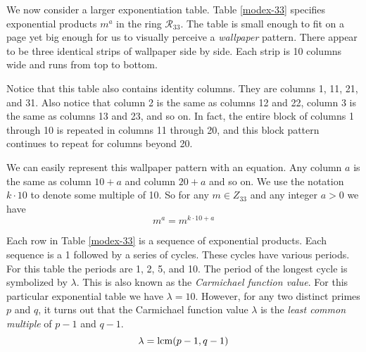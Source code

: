 

We now consider a larger exponentiation table.
Table \ref{modex-33} specifies exponential products $m^a$ in the ring $\mathcal{R}_{33}$.
The table is small enough to fit on a page 
yet big enough for us to visually perceive a \emph{wallpaper} pattern.
There appear to be three identical strips of wallpaper side by side.
Each strip is 10 columns wide and runs from top to bottom.

\begin{table}[!h]
\hspace{-9ex}
  
  \caption{$m^a \quad (\mathcal{R}_{33})$}
  \label{modex-33}
\end{table}

Notice that this table also contains identity columns.
They are columns 1, 11, 21, and 31.
Also notice that column 2 is the same as columns 12 and 22, 
column 3 is the same as columns 13 and 23, and so on.
In fact, the entire block of columns 1 through 10 is repeated in columns 11 through 20,
and this block pattern continues to repeat for columns beyond 20.

\newpage

We can easily represent this wallpaper pattern with an equation.
Any column $a$ is the same as column $10+a$ and column $20+a$ and so on.
We use the notation $k \cdot 10$ to denote some multiple of 10.
So for any $m \in Z_{33}$ and any integer $a > 0$ we have
\[  m^a = m^{k \cdot 10 + a}  \]

Each row in Table \ref{modex-33} is a sequence of exponential products.
Each sequence is a 1 followed by a series of cycles.
These cycles have various periods.
For this table the periods are 1, 2, 5, and 10.
The period of the longest cycle is symbolized by $\lambda$.
This is also known as the \emph{Carmichael function value}.
For this particular exponential table we have $\lambda=10$.
However, for any two distinct primes $p$ and $q$,
it turns out that the Carmichael function value $\lambda$ 
is the \emph{least common multiple} of $p-1$ and $q-1$.
\[  \lambda = \mathrm{lcm}(p-1,q-1)  \]

